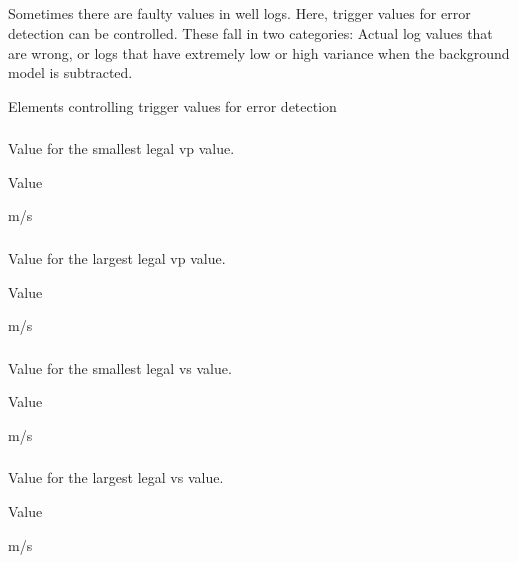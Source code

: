 \subsection{}
 \slist
   \item \Description Sometimes there are faulty values in well logs. Here, trigger values for error detection can be controlled. These fall in two categories: Actual log values that are wrong, or logs that have extremely low or high variance when the background model is subtracted.
   \item \Argument Elements controlling trigger values for error detection
   \item \Default
 \elist

\subsubsection{}
 \slist
   \item \Description Value for the smallest legal vp value.
   \item \Argument Value
   \item {} m/s
 \elist

\subsubsection{}
 \slist
   \item \Description Value for the largest legal vp value.
   \item \Argument Value
   \item {} m/s
 \elist

\subsubsection{}
 \slist
   \item \Description Value for the smallest legal vs value.
   \item \Argument Value
   \item {} m/s
 \elist

\subsubsection{}
 \slist
   \item \Description Value for the largest legal vs value.
   \item \Argument Value
   \item {} m/s
 \elist

